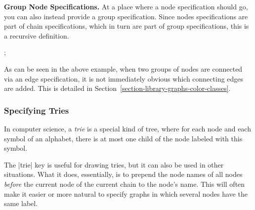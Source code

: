 \medskip
\textbf{Group Node Specifications.} At a place where a node specification
should go, you can also instead provide a group specification. Since nodes
specifications are part of chain specifications, which in turn are part of
group specifications, this is a recursive definition.
%
\begin{codeexample}[preamble={\usetikzlibrary{graphs}}]
\tikz {};
\end{codeexample}

As can be seen in the above example, when two groups of nodes are connected via
an edge specification, it is not immediately obvious which connecting edges are
added. This is detailed in Section~\ref{section-library-graphs-color-classes}.


\subsubsection{Specifying Tries}

In computer science, a \emph{trie} is a special kind of tree, where for each
node and each symbol of an alphabet, there is at most one child of the node
labeled with this symbol.

The |trie| key is useful for drawing tries, but it can also be used in other
situations. What it does, essentially, is to prepend the node names of all
nodes \emph{before} the current node of the current chain to the node's name.
This will often make it easier or more natural to specify graphs in which
several nodes have the same label.

